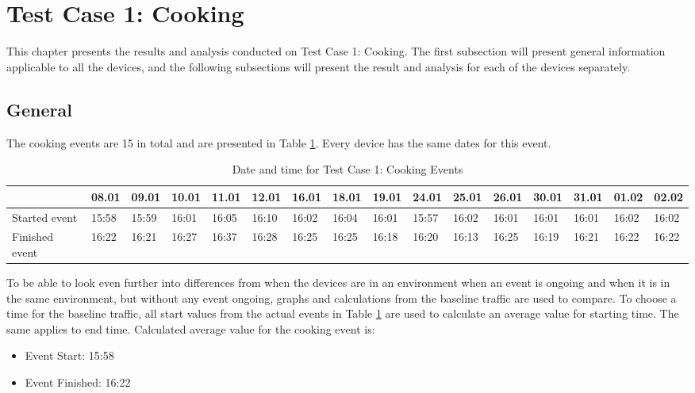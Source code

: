 \section{Test Case 1: Cooking}
This chapter presents the results and analysis conducted on Test Case 1: Cooking. The first subsection will present general information applicable to all the devices, and the following subsections will present the result and analysis for each of the devices separately. 
\subsection{General}
The cooking events are 15 in total and are presented in Table \ref{tab:CookingDates}. Every device has the same dates for this event. 
\begin{table}[!hbtp]
    \centering
    \caption{Date and time for Test Case 1: Cooking Events}
    \begin{adjustbox}{width=1\textwidth}
            \begin{tabular}{l|l|l|l|l|l|l|l|l|l|l|l|l|l|l|l|}
            \cline{2-16} 
            & 08.01 & 09.01 & 10.01 & 11.01 & 12.01 & 16.01 & 18.01 & 19.01 & 24.01 & 25.01 & 26.01 & 30.01 & 31.01 & 01.02 & 02.02 \\
            \hline
            \multicolumn{1}{|l|}{Started event}  & 15:58 & 15:59 & 16:01 & 16:05 & 16:10 & 16:02 & 16:04 & 16:01 & 15:57 & 16:02 & 16:01 & 16:01 & 16:01 & 16:02 & 16:02 \\ 
            \hline
            \multicolumn{1}{|l|}{Finished event} & 16:22 & 16:21 & 16:27 & 16:37 & 16:28 & 16:25 & 16:25 & 16:18 & 16:20 & 16:13 & 16:25 & 16:19 & 16:21 & 16:22 & 16:22 \\ 
            \hline
            \end{tabular}
    \end{adjustbox}
    \label{tab:CookingDates}
\end{table}
\FloatBarrier

To be able to look even further into differences from when the devices are in an environment when an event is ongoing and when it is in the same environment, but without any event ongoing, graphs and calculations from the baseline traffic are used to compare. To choose a time for the baseline traffic, all start values from the actual events in Table \ref{tab:CookingDates} are used to calculate an average value for starting time. The same applies to end time. Calculated average value for the cooking event is:

\begin{itemize}
    \item Event Start: 15:58
    \item Event Finished: 16:22
\end{itemize}
\newpage

